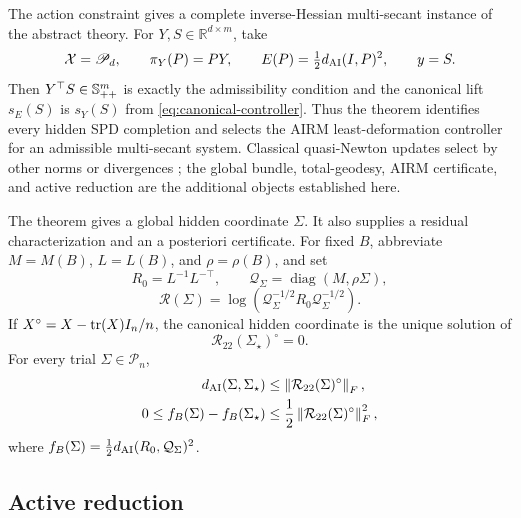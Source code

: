 The action constraint gives a complete inverse-Hessian multi-secant instance
of the abstract theory.  For \(Y,S\in\mathbb R^{d\times m}\), take
\[
  \mathcal X=\mathscr P_d,\qquad
  \pi_Y(P)=PY,\qquad
  E(P)=\tfrac12d_{\mathrm{AI}}(I,P)^2,\qquad
  y=S.
\]
Then \(Y^\top S\in\mathbb{S}_{++}^m\) is exactly the admissibility condition and the
canonical lift \(s_E(S)\) is \(s_Y(S)\) from
\cref{eq:canonical-controller}.  Thus the theorem identifies every hidden SPD
completion and selects the AIRM least-deformation controller for an admissible
multi-secant system.  Classical quasi-Newton updates select by other norms or
divergences
\cite{dennis1979leastchange,fletcher1991variational,kanamori2013bregman}; the
global bundle, total-geodesy, AIRM certificate, and active reduction are the
additional objects established here.

The theorem gives a global hidden coordinate \(\Sigma\).  It also supplies a
residual characterization and an a posteriori certificate.  For fixed \(B\),
abbreviate \(M=M(B)\), \(L=L(B)\), and \(\rho=\rho(B)\), and set
\[
  R_0=L^{-1}L^{-\top},
  \qquad
  \mathcal Q_\Sigma=\operatorname{diag}(M,\rho\Sigma),
\]
\begin{equation}
  \mathcal R(\Sigma)
  =\log(\mathcal Q_\Sigma^{-1/2}R_0\mathcal Q_\Sigma^{-1/2}).
  \label{eq:action-residual}
\end{equation}
If \(X^\circ=X-\operatorname{tr}(X)I_n/n\), the canonical hidden coordinate is the unique
solution of
\begin{equation}
  \mathcal R_{22}(\Sigma_\star)^\circ=0.
  \label{eq:action-normal-equation}
\end{equation}
For every trial \(\Sigma\in\mathscr P_n\),
\begin{align}
  d_{\mathrm{AI}}(\Sigma,\Sigma_\star)
  &\le\left\lVert \mathcal R_{22}(\Sigma)^\circ\right\rVert_F,
  \label{eq:action-distance-certificate}\\
  0\le f_B(\Sigma)-f_B(\Sigma_\star)
  &\le\frac12\left\lVert \mathcal R_{22}(\Sigma)^\circ\right\rVert_F^2,
  \label{eq:action-value-certificate}
\end{align}
where \(f_B(\Sigma)=\tfrac12d_{\mathrm{AI}}(R_0,\mathcal Q_\Sigma)^2\).

\subsection{Active reduction}

